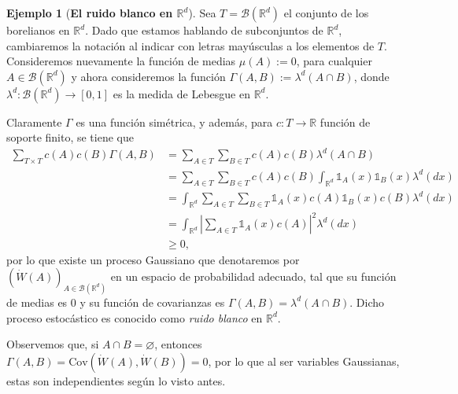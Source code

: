 \documentclass[letterpaper,twoside,12pt]{book}
\newcommand{\R}{\mathbb{R}}
\newcommand{\B}{\mathcal{B}}
\newcommand{\W}{\dot{W}}
\newcommand{\1}{\mathds{1}}
\newcommand{\abs}[1]{\left\lvert #1 \right\rvert}
\renewcommand{\to}{\rightarrow}
\theoremstyle{definition}
\theoremstyle{definition}
\theoremstyle{definition}
\theoremstyle{definition}
\theoremstyle{definition}
\theoremstyle{definition}
\newtheorem{ejem}{Ejemplo}
\theoremstyle{definition}
\begin{document}
\begin{ejem}[\textbf{El ruido blanco en $\R^{d}$}] 
Sea $T=\B(\R^{d})$ el conjunto de los borelianos en $\R^d$.
Dado que estamos hablando de subconjuntos de $\R^{d}$, cambiaremos la notación al indicar con letras mayúsculas a los elementos de $T$.
Consideremos nuevamente la función de medias $\mu(A):=0$, para cualquier $A\in \B(\R^{d})$ y ahora consideremos la función $\Gamma(A,B):=\lambda^{d}(A\cap B)$, donde $\lambda^{d}:\B(\R^{d})\to [0,1]$ es la medida de Lebesgue en $\R^{d}$.

 Claramente $\Gamma$ es una función simétrica, y además, para $c:T\to\R$ función de soporte finito, se tiene que 
 \begin{align*}
    \sum_{T\times T}^{}c(A)c(B)\Gamma(A,B)&=\sum_{A\in T}^{}\sum_{B\in T}c(A)c(B)\lambda^{d}(A\cap B)\\
    &=\sum_{A\in T}^{}\sum_{B\in T}c(A)c(B)\int_{\R^d}\1_{A}(x)\1_{B}(x)\lambda^{d}(dx)\\
    &=\int_{\R^{d}}\sum_{A\in T}\sum_{B\in T}\1_{A}(x)c(A)\1_{B}(x)c(B)\lambda^{d}(dx)\\
    &=\int_{\R^{d}}\abs{\sum_{A\in T}\1_{A}(x)c(A)}^2\lambda^{d}(dx)\\
    &\geq0,
    \end{align*}
por lo que existe un proceso Gaussiano que denotaremos por $(\dot{W}(A))_{A\in \B(\R^{d})}$ en un espacio de probabilidad adecuado, tal que su función de medias es $0$ y su función de covarianzas es $\Gamma(A,B)=\lambda^{d}(A\cap B)$. Dicho proceso estocástico es conocido como \textit{ruido blanco} en $\R^{d}$.

Observemos que, si $A\cap B=\varnothing$, entonces $\Gamma(A,B)=\text{Cov}\left(\W(A),\W(B)\right)=0$, por lo que al ser variables Gaussianas, estas son independientes según lo visto antes.


\end{ejem}
\end{document}
